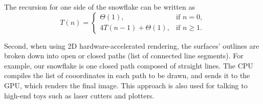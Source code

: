 \documentclass[12pt,twoside]{article}
\begin{document}
\begin{problems}
\begin{problemparts}
{    The recursion for one side of the snowflake can be written as
    \[
    T(n)=\left\{\begin{array}{ll}
         \Theta(1), &\text{if } n = 0, \\
         4T(n-1)+\Theta(1), &\text{if } n \ge 1.
         \end{array}\right. 
    \]
  }
\end{problemparts}

Second, when using 2D hardware-accelerated rendering, the surfaces'
outlines are broken down into open or closed paths (list of connected
line segments). For example, our snowflake is one closed path composed of
straight lines. The CPU compiles the list of cooordinates in each path to be
drawn, and sends it to the GPU, which renders the final image. This approach is
also used for talking to high-end toys such as laser cutters and plotters.


\end{problems}
\end{document}
